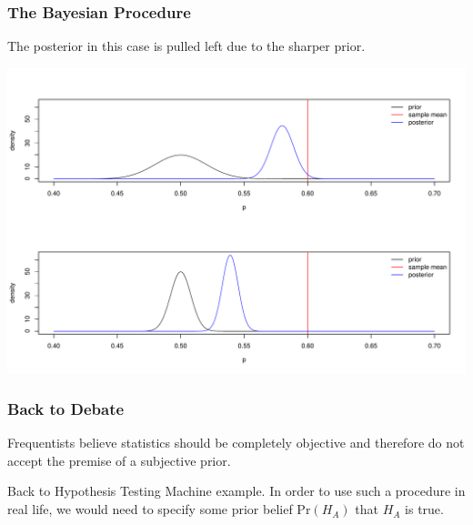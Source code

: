 \documentclass[handout]{beamer}
\newcommand{\blue}[1]{\textcolor{blue2}{#1}}
\newcommand{\prob}{\mbox{Pr}}
\begin{document}
\begin{frame}
\frametitle{The Bayesian Procedure}
The posterior in this case is pulled left due to the sharper prior.
\begin{center}
\includegraphics[width=\textwidth]{figure/bayes6.pdf} 
\end{center}

\end{frame}


\begin{frame}
\frametitle{Back to Debate}

Frequentists believe statistics should be completely \blue{objective} and therefore do not accept the premise of a subjective prior.  

\pause\vspace{0.5cm}

Back to Hypothesis Testing Machine example.  In order to use such a procedure in real life, we would need to specify some prior belief $\prob(H_A)$ that $H_A$ is true.  

%

\end{frame}
\end{document}
